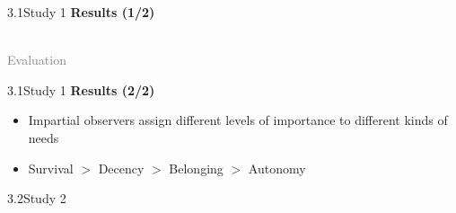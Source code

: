 \documentclass[xcolor=table,9pt,aspectratio=169]{beamer}
\begin{document}
\begin{frame}{\vspace*{10mm}3.1\hspace*{1em}Study 1}
\textbf{Results (1/2)}\\
\medskip
\begin{center}
   \\
   \textcolor{gray}{Evaluation}
\end{center}
\end{frame}


\begin{frame}{\vspace*{10mm}3.1\hspace*{1em}Study 1}
\textbf{Results (2/2)}\\
\medskip
\begin{itemize}
   \item Impartial observers assign different levels of importance to different kinds of needs
   \item Survival $>$ Decency $>$ Belonging $>$ Autonomy
\end{itemize}
\end{frame}


\begin{frame}
\begin{overlayarea}{\textwidth}{0.81\paperheight}{
   \vspace*{11mm}
   \textcolor{uolblue}
   {3.2\hspace*{1em}Study 2}
}
\end{overlayarea}
\end{frame}
\end{document}
